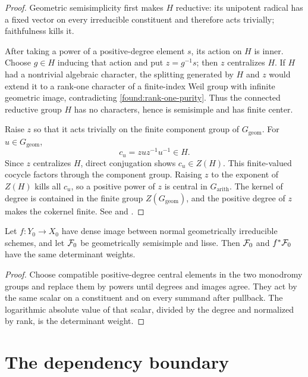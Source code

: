 \begin{proof}
Geometric semisimplicity first makes \(H\) reductive: its unipotent
radical has a fixed vector on every irreducible constituent and
therefore acts trivially; faithfulness kills it.

After taking a power of a positive-degree element \(s\), its action on
\(H\) is inner.  Choose \(g\in H\) inducing that action and put
\(z=g^{-1}s\); then \(z\) centralizes \(H\).  If \(H\) had a nontrivial
algebraic character, the splitting generated by \(H\) and \(z\) would
extend it to a rank-one character of a finite-index Weil group with
infinite geometric image, contradicting
\cref{found:rank-one-purity}.  Thus the connected reductive group \(H\)
has no characters, hence is semisimple and has finite center.

Raise \(z\) so that it acts trivially on the finite component group of
\(G_{\mathrm{geom}}\).  For \(u\in G_{\mathrm{geom}}\),
\[
 c_u=zuz^{-1}u^{-1}\in H.
\]
Since \(z\) centralizes \(H\), direct conjugation shows
\(c_u\in Z(H)\).  This finite-valued cocycle factors through the
component group.  Raising \(z\) to the exponent of \(Z(H)\) kills all
\(c_u\), so a positive power of \(z\) is central in
\(G_{\mathrm{arith}}\).  The kernel of degree is contained in the
finite group \(Z(G_{\mathrm{geom}})\), and the positive degree of \(z\)
makes the cokernel finite.  See
\cite[Chapter~I, Section~3]{KiehlWeissauer} and
\cite{StanfordL22}.
\end{proof}

\begin{corollary}
\label{cor:dense-pullback-det-weights}
Let \(f:Y_0\to X_0\) have dense image between normal geometrically
irreducible schemes, and let \(\mathcal F_0\) be geometrically semisimple and
lisse.  Then \(\mathcal F_0\) and \(f^*\mathcal F_0\) have the same determinant
weights.
\end{corollary}

\begin{proof}
Choose compatible positive-degree central elements in the two
monodromy groups and replace them by powers until degrees and images
agree.  They act by the same scalar on a constituent and on every
summand after pullback.  The logarithmic absolute value of that scalar,
divided by the degree and normalized by rank, is the determinant
weight.
\end{proof}

\section{The dependency boundary}

